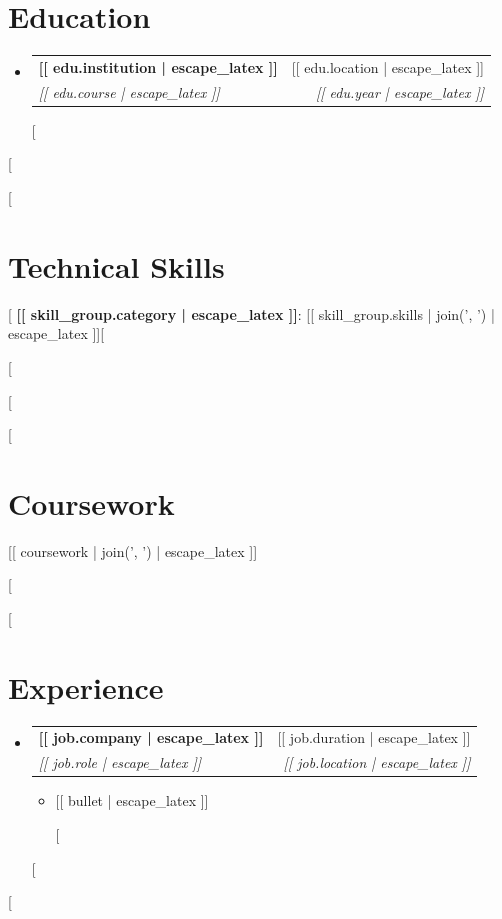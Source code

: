 \documentclass[letterpaper,11pt]{article}
\makeatletter
\newcommand{\resumeItemPlain}[1]{
  \item\small{#1 \vspace{-2pt}}
}
\newcommand{\resumeSubheading}[4]{
  \vspace{-1pt}\item
    \begin{tabular*}{0.97\textwidth}{l@{\extracolsep{\fill}}r}
      \textbf{#1} & #2 \\
      \textit{\small#3} & \textit{\small #4} \\
    \end{tabular*}\vspace{-5pt}
}
\newcommand{\resumeSubHeadingListStart}{\begin{itemize}[leftmargin=*]}
\newcommand{\resumeSubHeadingListEnd}{\end{itemize}}
\newcommand{\resumeItemListStart}{\begin{itemize}}
\newcommand{\resumeItemListEnd}{\end{itemize}\vspace{-5pt}}
\makeatother
\begin{document}
\section{Education}
  \resumeSubHeadingListStart
    [%
    \resumeSubheading
      {[[ edu.institution | escape_latex ]]}{[[ edu.location | escape_latex ]]}
      {[[ edu.course | escape_latex ]]}{[[ edu.year | escape_latex ]]}
    [%
  \resumeSubHeadingListEnd
[%

[%
\section{Technical Skills}
 \begin{itemize}[leftmargin=0.15in, label={}]
    \small{\item{
    [%
     \textbf{[[ skill_group.category | escape_latex ]]}{: [[ skill_group.skills | join(', ') | escape_latex ]]}[%

    [%
    }}
 \end{itemize}
 \vspace{-16pt}
[%

[%
\section{Coursework}
 \begin{itemize}[leftmargin=0.15in, label={}]
    \small{\item{[[ coursework | join(', ') | escape_latex ]]}}
 \end{itemize}
 \vspace{-16pt}
[%

[%
\section{Experience}
  \resumeSubHeadingListStart
    [%
    \resumeSubheading
      {[[ job.company | escape_latex ]]}{[[ job.duration | escape_latex ]]}
      {[[ job.role | escape_latex ]]}{[[ job.location | escape_latex ]]}
      \resumeItemListStart
        [%
        \resumeItemPlain{[[ bullet | escape_latex ]]}
        [%
      \resumeItemListEnd
    [%
  \resumeSubHeadingListEnd
\vspace{-16pt}
[%
\end{document}
